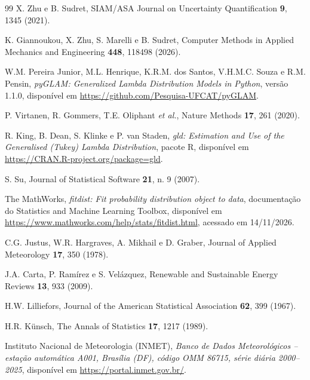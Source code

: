 \begin{thebibliography}{99}
 X. Zhu e B. Sudret, SIAM/ASA Journal on Uncertainty Quantification \textbf{9}, 1345 (2021).

 K. Giannoukou, X. Zhu, S. Marelli e B. Sudret, Computer Methods in Applied Mechanics and Engineering \textbf{448}, 118498 (2026).

 W.M. Pereira Junior, M.L. Henrique, K.R.M. dos Santos, V.H.M.C. Souza e R.M. Pensin, \textit{pyGLAM: Generalized Lambda Distribution Models in Python}, versão 1.1.0, disponível em \url{https://github.com/Pesquisa-UFCAT/pyGLAM}.

 P. Virtanen, R. Gommers, T.E. Oliphant \textit{et al.}, Nature Methods \textbf{17}, 261 (2020).

 R. King, B. Dean, S. Klinke e P. van Staden, \textit{gld: Estimation and Use of the Generalised (Tukey) Lambda Distribution}, pacote R, disponível em \url{https://CRAN.R-project.org/package=gld}.

 S. Su, Journal of Statistical Software \textbf{21}, n. 9 (2007).

 The MathWorks, \textit{fitdist: Fit probability distribution object to data}, documentação do Statistics and Machine Learning Toolbox, disponível em \url{https://www.mathworks.com/help/stats/fitdist.html}, acessado em 14/11/2026.

 C.G. Justus, W.R. Hargraves, A. Mikhail e D. Graber, Journal of Applied Meteorology \textbf{17}, 350 (1978).

 J.A. Carta, P. Ramírez e S. Velázquez, Renewable and Sustainable Energy Reviews \textbf{13}, 933 (2009).

 H.W. Lilliefors, Journal of the American Statistical Association \textbf{62}, 399 (1967).

 H.R. Künsch, The Annals of Statistics \textbf{17}, 1217 (1989).

 Instituto Nacional de Meteorologia (INMET), \textit{Banco de Dados Meteorológicos -- estação automática A001, Brasília (DF), código OMM 86715, série diária 2000--2025}, disponível em \url{https://portal.inmet.gov.br/}.

\end{thebibliography}
